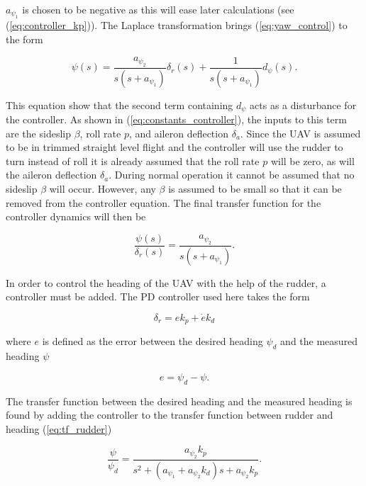 $a_{\psi_1}$ is chosen to be negative as this will ease later calculations (see (\ref{eq:controller_kp})). The Laplace transformation brings (\ref{eq:yaw_control}) to the form

\begin{equation}
	\label{eq:yaw_controller_s}
	\psi(s) = \frac{a_{\psi_2}}{s(s+a_{\psi_1})}\delta_r(s) + \frac{1}{s(s+a_{\psi_1})}d_\psi(s).
\end{equation}

This equation show that the second term containing $d_\psi$ acts as a disturbance for the controller. As shown in (\ref{eq:constants_controller}), the inputs to this term are the sideslip $\beta$, roll rate $p$, and aileron deflection $\delta_a$. Since the UAV is assumed to be in trimmed straight level flight and the controller will use the rudder to turn instead of roll it is already assumed that the roll rate $p$ will be zero, as will the aileron deflection $\delta_a$. During normal operation it cannot be assumed that no sideslip $\beta$ will occur. However, any $\beta$ is assumed to be small so that it can be removed from the controller equation. The final transfer function for the controller dynamics will then be

\begin{equation}
	\label{eq:tf_rudder}
	\frac{\psi(s)}{\delta_r(s)} = \frac{a_{\psi_2}}{s(s+a_{\psi_1})}.
\end{equation}

In order to control the heading of the UAV with the help of the rudder, a controller must be added. The PD controller used here takes the form

\begin{equation}
	\delta_r = ek_p + \dot{e}k_d
\end{equation}

where $e$ is defined as the error between the desired heading $\psi_d$ and the measured heading $\psi$

\begin{equation}
	e = \psi_d - \psi.
\end{equation}

The transfer function between the desired heading and the measured heading is found by adding the controller to the transfer function between rudder and heading (\ref{eq:tf_rudder})

\begin{equation}
	\label{eq:rudder_PD}
	\frac{\psi}{\psi_d} = \frac{a_{\psi_2}k_p}{s^2 + (a_{\psi_1}+a_{\psi_2}k_d)s + a_{\psi_2}k_p}.
\end{equation}

